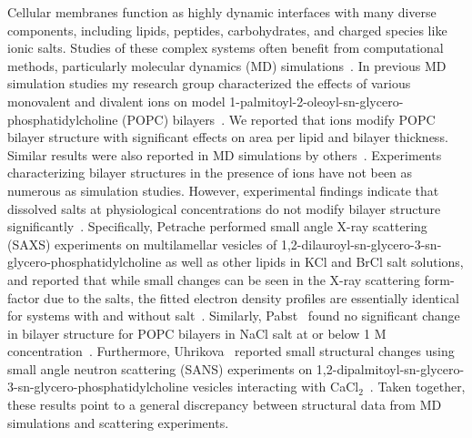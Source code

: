 Cellular membranes function as highly dynamic interfaces with many diverse components, 
including lipids, peptides, carbohydrates, and charged species like ionic salts.
Studies of these complex systems often benefit from computational methods, 
particularly molecular dynamics (MD) simulations~\cite{berkowitz:2019}. 
In previous MD simulation studies my research group characterized the effects of various 
monovalent and divalent ions on model 1-palmitoyl-2-oleoyl-sn-glycero-phosphatidylcholine (POPC) 
bilayers~\cite{pandit:2008:simulationtextbook,kruczek:2017,kruczek:2019,saunders:2019}. 
We reported that ions modify POPC bilayer structure with significant
effects on area per lipid and bilayer thickness. Similar results were also reported in MD simulations by
others~\cite{Bockmann:2003,cordomi:2008,gurtovenko:2008,Cordomi:2009,jurkiewicz:2012}.
Experiments characterizing bilayer structures in the presence of ions
have not been as numerous as simulation studies. However, experimental findings indicate that 
dissolved salts at physiological concentrations do not modify bilayer structure
significantly~\cite{pabst:2007,petrache:2006:swelling,uhrikova:2008}.
Specifically, Petrache \etal{} performed small angle X-ray scattering (SAXS) experiments on
multilamellar vesicles of 1,2-dilauroyl-sn-glycero-3-sn-glycero-phosphatidylcholine 
as well as other lipids in KCl and BrCl salt solutions, 
and reported that while small changes can be seen in the
X-ray scattering form-factor due to the 
salts, 
the fitted electron density profiles are essentially identical for
systems with and without 
salt~\cite{petrache:2006:swelling}. 
Similarly, Pabst \etal~found no significant change in bilayer structure 
for POPC bilayers in NaCl salt at or below 1 M concentration~\cite{pabst:2007}.
Furthermore, Uhrikova \etal~reported small structural changes using small angle neutron scattering
(SANS) experiments on 1,2-dipalmitoyl-sn-glycero-3-sn-glycero-phosphatidylcholine 
vesicles interacting with CaCl$_{2}$~\cite{uhrikova:2008}. 
Taken together, these results point to a general discrepancy between structural data 
from MD simulations and scattering experiments.

